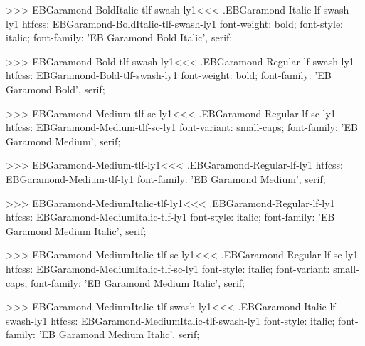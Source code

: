 {{>>>
\<EBGaramond-BoldItalic-tlf-swash-ly1\><<<
.EBGaramond-Italic-lf-swash-ly1
htfcss:  EBGaramond-BoldItalic-tlf-swash-ly1  font-weight: bold; font-style: italic; font-family: 'EB Garamond Bold Italic', serif;

>>>
\<EBGaramond-Bold-tlf-swash-ly1\><<<
.EBGaramond-Regular-lf-swash-ly1
htfcss:  EBGaramond-Bold-tlf-swash-ly1  font-weight: bold; font-family: 'EB Garamond Bold', serif;

>>>
\<EBGaramond-Medium-tlf-sc-ly1\><<<
.EBGaramond-Regular-lf-sc-ly1
htfcss:  EBGaramond-Medium-tlf-sc-ly1  font-variant: small-caps; font-family: 'EB Garamond Medium', serif;

>>>
\<EBGaramond-Medium-tlf-ly1\><<<
.EBGaramond-Regular-lf-ly1
htfcss:  EBGaramond-Medium-tlf-ly1  font-family: 'EB Garamond Medium', serif;

>>>
\<EBGaramond-MediumItalic-tlf-ly1\><<<
.EBGaramond-Regular-lf-ly1
htfcss:  EBGaramond-MediumItalic-tlf-ly1  font-style: italic; font-family: 'EB Garamond Medium Italic', serif;

>>>
\<EBGaramond-MediumItalic-tlf-sc-ly1\><<<
.EBGaramond-Regular-lf-sc-ly1
htfcss:  EBGaramond-MediumItalic-tlf-sc-ly1  font-style: italic; font-variant: small-caps; font-family: 'EB Garamond Medium Italic', serif;

>>>
\<EBGaramond-MediumItalic-tlf-swash-ly1\><<<
.EBGaramond-Italic-lf-swash-ly1
htfcss:  EBGaramond-MediumItalic-tlf-swash-ly1  font-style: italic; font-family: 'EB Garamond Medium Italic', serif;

}}

